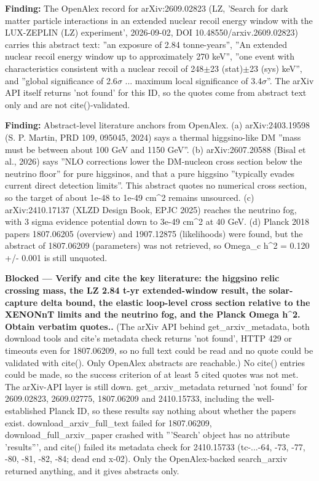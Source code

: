 \documentclass[11pt,a4paper]{article}
\begin{document}
\textbf{Finding:} The OpenAlex record for arXiv:2609.02823 (LZ, 'Search for dark matter particle interactions in an extended nuclear recoil energy window with the LUX-ZEPLIN (LZ) experiment', 2026-09-02, DOI 10.48550/arxiv.2609.02823) carries this abstract text: ''an exposure of 2.84 tonne-years'', ''An extended nuclear recoil energy window up to approximately 270 keV'', ''one event with characteristics consistent with a nuclear recoil of 248$\pm$23 (stat)$\pm$23 (sys) keV'', and ''global significance of 2.6$\sigma$ ... maximum local significance of 3.4$\sigma$''. The arXiv API itself returns 'not found' for this ID, so the quotes come from abstract text only and are not cite()-validated.

\textbf{Finding:} Abstract-level literature anchors from OpenAlex. (a) arXiv:2403.19598 (S. P. Martin, PRD 109, 095045, 2024) says a thermal higgsino-like DM ''mass must be between about 100 GeV and 1150 GeV''. (b) arXiv:2607.20588 (Bisal et al., 2026) says ''NLO corrections lower the DM-nucleon cross section below the neutrino floor'' for pure higgsinos, and that a pure higgsino ''typically evades current direct detection limits''. This abstract quotes no numerical cross section, so the target of about 1e-48 to 1e-49 cm\textasciicircum{}2 remains unsourced. (c) arXiv:2410.17137 (XLZD Design Book, EPJC 2025) reaches the neutrino fog, with 3 sigma evidence potential down to 3e-49 cm\textasciicircum{}2 at 40 GeV. (d) Planck 2018 papers 1807.06205 (overview) and 1907.12875 (likelihoods) were found, but the abstract of 1807.06209 (parameters) was not retrieved, so Omega\_c h\textasciicircum{}2 = 0.120 +/- 0.001 is still unquoted.

\textbf{Blocked --- Verify and cite the key literature: the higgsino relic crossing mass, the LZ 2.84 t-yr extended-window result, the solar-capture delta bound, the elastic loop-level cross section relative to the XENONnT limits and the neutrino fog, and the Planck Omega h\textasciicircum{}2. Obtain verbatim quotes..} (The arXiv API behind get\_arxiv\_metadata, both download tools and cite's metadata check returns 'not found', HTTP 429 or timeouts even for 1807.06209, so no full text could be read and no quote could be validated with cite(). Only OpenAlex abstracts are reachable.) No cite() entries could be made, so the success criterion of at least 5 cited quotes was not met. The arXiv-API layer is still down. get\_arxiv\_metadata returned 'not found' for 2609.02823, 2609.02775, 1807.06209 and 2410.15733, including the well-established Planck ID, so these results say nothing about whether the papers exist. download\_arxiv\_full\_text failed for 1807.06209, download\_full\_arxiv\_paper crashed with '''Search' object has no attribute 'results''', and cite() failed its metadata check for 2410.15733 (tc-...-64, -73, -77, -80, -81, -82, -84; dead end x-02). Only the OpenAlex-backed search\_arxiv returned anything, and it gives abstracts only.
\end{document}
